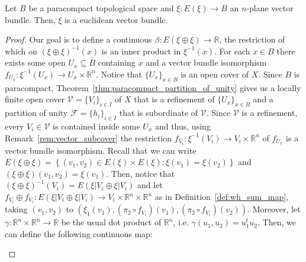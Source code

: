\begin{proposition}\label{prop:paracompact_is_euclidean} Let $B$ be a paracompact topological space and $\xi:E(\xi)\to B$ an $n$-plane vector bundle. Then, $\xi$ is a euclidean vector bundle.
\end{proposition}
\begin{proof} Our goal is to define a continuous $\beta:E(\xi\oplus\xi)\to\mathbb{R}$, the restriction of which on $(\xi\oplus\xi)^{-1}(x)$ is an inner product in $\xi^{-1}(x)$. For each $x\in B$ there exists some open $U_x\subseteq B$ containing $x$ and a vector bundle isomorphism $f_{U_x}:\xi^{-1}(U_x)\to U_x\times\mathbb{R}^n$. Notice that $\{U_x\}_{x\in B}$ is an open cover of $X$. Since $B$ is paracompact, Theorem~\ref{thm:paracompact_partition_of_unity} gives us a locally finite open cover $\mathcal{V}=\{V_i\}_{i\in I}$ of $X$ that is a refinement of $\{U_x\}_{x\in B}$ and a partition of unity $\mathcal{F}=\{h_i\}_{i\in I}$ that is subordinate of $\mathcal{V}$. Since $\mathcal{V}$ is a refinement, every $V_i\in\mathcal{V}$ is contained inside some $U_x$ and thus, using Remark~\ref{rem:vector_subcover} the restriction $f_{V_i}:\xi^{-1}(V_i)\to V_i\times\mathbb{R}^n$ of $f_{U_x}$ is a vector bundle isomorphism. Recall that we can write $E(\xi\oplus\xi)=\left\{(v_1,v_2)\in E(\xi)\times E(\xi):\xi(v_1)=\xi(v_2)\right\}$ and $(\xi\oplus\xi)(v_1,v_2)=\xi(v_1)$. Then, notice that $(\xi\oplus\xi)^{-1}(V_i)=E(\xi|V_i\oplus\xi|V_i)$ and let $f_{V_i}\oplus f_{V_i}:E(\xi|V_i\oplus\xi|V_i)\to V_i\times\mathbb{R}^n\times\mathbb{R}^n$ as in Definition~\ref{def:wh_sum_map}, taking $(v_1,v_2)$ to $(\xi_1(v_1),(\pi_2\circ f_{V_i})(v_1),(\pi_2\circ f_{V_i})(v_2))$. Moreover, let $\gamma:\mathbb{R}^n\times\mathbb{R}^n\to\mathbb{R}$ be the usual dot product of $\mathbb{R}^n$, i.e. $\gamma(u_1,u_2)=u_1^tu_2$. Then, we can define the following continuous map:
\begin{center}
\end{center}

\end{proof}
